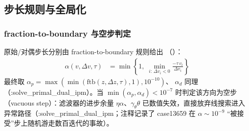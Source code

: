 \subsection{步长规则与全局化}\label{subsec:pipm-step}

\subsubsection*{fraction-to-boundary 与空步判定}
原始/对偶步长分别由 fraction-to-boundary 规则给出
（）：
\begin{align*}
\alpha(v,\Delta v,\tau) &= \min\!\left\{1,\;
\min_{i:\,\Delta v_i<0}\frac{-\tau\, v_i}{\Delta v_i}\right\}
\end{align*}
最终取 $\alpha_p=\max(\min(\mathrm{ftb}(z,\Delta z,\tau),1),10^{-10})$、
$\alpha_d$ 同理（:solve\_primal\_dual\_ipm）。当 $\min(\alpha_p,\alpha_d)<10^{-7}$
时判定该方向为空步（vacuous step）：滤波器的进步余量
$\eta\alpha$、$\gamma_\theta\theta$ 已数值失效，直接放弃线搜索进入
异常路径（:solve\_primal\_dual\_ipm；注释记录了 case13659 在 $\alpha\sim10^{-9}$
“被接受”步上随机游走数百迭代的事故）。

